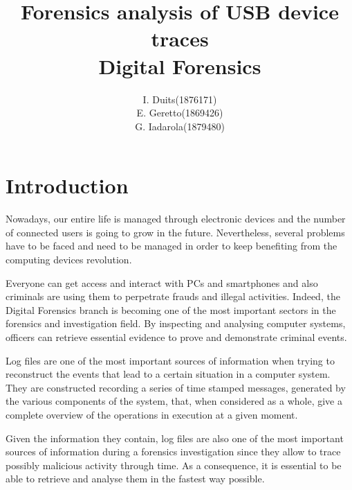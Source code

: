 \documentclass[a4paper]{article}
\title{Forensics analysis of USB device traces\\
\large Digital Forensics}
\author{
\begin{tabular}{>{\raggedleft}m{5cm}m{5cm}}
I. Duits & (1876171) \\
E. Geretto & (1869426) \\
G. Iadarola & (1879480) \\
\end{tabular}
}
\begin{document}
\maketitle


\section{Introduction}
Nowadays, our entire life is managed through electronic devices and the number of
connected users is going to grow in the future. Nevertheless, several
problems have to be faced and need to be managed in order to keep benefiting
from the computing devices revolution.

Everyone can get access and interact with PCs and smartphones and also criminals
are using them to perpetrate frauds and illegal activities. Indeed, the Digital
Forensics branch is becoming one of the most important sectors in the forensics
and investigation field. By inspecting and analysing computer systems, officers
can retrieve essential evidence to prove and demonstrate criminal events.

Log files are one of the most important sources of information when trying to
reconstruct the events that lead to a certain situation in a computer system.
They are constructed recording a series of time stamped messages, generated by
the various components of the system, that, when considered as a whole, give a
complete overview of the operations in execution at a given moment.

Given the information they contain, log files are also one of the most important
sources of information during a forensics investigation since they allow to
trace possibly malicious activity through time. As a consequence, it is
essential to be able to retrieve and analyse them in the fastest way
possible.~\cite{finlayson1987log}
\end{document}
